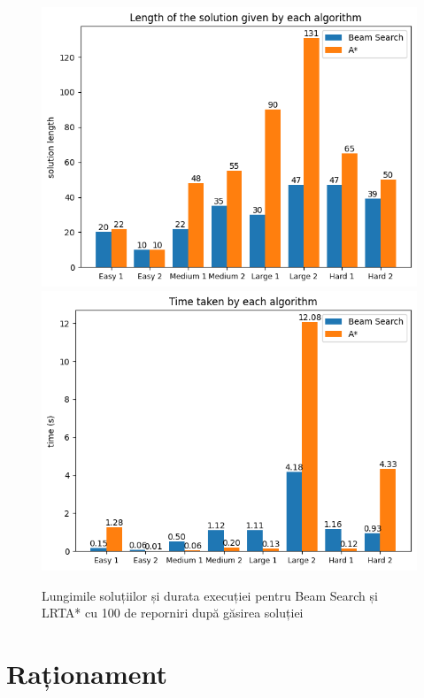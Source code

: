 \documentclass{article}
\begin{document}
\begin{figure}
    \includegraphics[scale=0.45]{plots/solution/enhanced_astar/solution_length.png}
    \includegraphics[scale=0.45]{plots/solution/enhanced_astar/time.png}
    \caption{Lungimile soluțiilor și durata execuției pentru Beam Search și 
    LRTA* cu 100 de reporniri după găsirea soluției}
    \label{fig:enhanced_astar}
\end{figure}

\section{Raționament}
\end{document}
